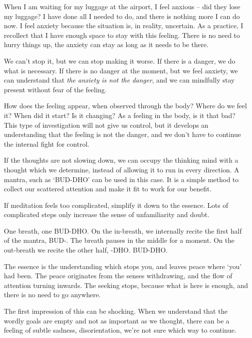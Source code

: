 When I am waiting for my luggage at the airport, I feel anxious -- did
they lose my luggage? I have done all I needed to do, and there is
nothing more I can do now. I feel anxiety because the situation is, in
reality, uncertain. As a practice, I recollect that I have enough space
to stay with this feeling. There is no need to hurry things up, the
anxiety can stay as long as it needs to be there.

We can't stop it, but we can stop making it worse. If there is a danger,
we do what is necessary. If there is no danger at the moment, but we
feel anxiety, we can understand that \emph{the anxiety is not the
danger}, and we can mindfully stay present without fear of the feeling.


How does the feeling appear, when observed through the body? Where do we
feel it? When did it start? Is it changing? As a feeling in the body, is
it that bad? This type of investigation will not give us control, but it
develops an understanding that the feeling is not the danger, and we
don't have to continue the internal fight for control.

If the thoughts are not slowing down, we can occupy the thinking mind
with a thought which we determine, instead of allowing it to run in
every direction. A mantra, such as `BUD-DHO' can be used in this case.
It is a simple method to collect our scattered attention and make it fit
to work for our benefit.

If meditation feels too complicated, simplify it down to the essence.
Lots of complicated steps only increase the sense of unfamiliarity and
doubt.

One breath, one BUD-DHO. On the in-breath, we internally recite the
first half of the mantra, BUD-. The breath pauses in the middle for a
moment. On the out-breath we recite the other half, -DHO. BUD-DHO.

The essence is the understanding which stops you, and leaves peace where
`you' had been. The peace originates from the senses withdrawing, and
the flow of attention turning inwards. The seeking stops, because what
is here is enough, and there is no need to go anywhere.


The first impression of this can be shocking. When we understand that
the wordly goals are empty and not as important as we thought, there can
be a feeling of subtle sadness, disorientation, we're not sure which way
to continue.

